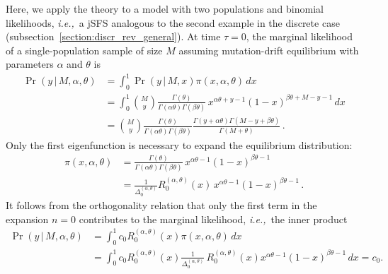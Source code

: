 \documentclass[preprint]{elsarticle}
\newcommand\given{{\,|\,}}
\newcommand\ie{{\it i.e.,}}
\begin{document}
Here, we apply the theory to a model with two populations and binomial likelihoods, \ie\ a jSFS analogous to the second example in the discrete case (subsection~\ref{section:discr_rev_general}). At time $\tau=0$, the marginal likelihood of a single-population sample of size $M$ assuming mutation-drift equilibrium with parameters $\alpha$ and $\theta$ is
\begin{equation}
\begin{split}
    \Pr(y\given M,\alpha,\theta)
    &=\int_0^1 \Pr(y\given M,x) \pi(x,\alpha,\theta)\,dx\\
    &=\int_0^1 \binom{M}{y}\frac{\Gamma(\theta)}{\Gamma(\alpha\theta)\Gamma(\beta\theta)}\,x^{\alpha\theta+y-1}(1-x)^{\beta\theta+M-y-1}\,dx\\
    &=\binom{M}{y}\frac{\Gamma(\theta)}{\Gamma(\alpha\theta)\Gamma(\beta\theta)}
    \frac{\Gamma(y+\alpha\theta)\Gamma(M-y+\beta\theta)}{\Gamma(M+\theta)}\,.
\end{split}
\end{equation}
Only the first eigenfunction is necessary to expand the equilibrium distribution:
\begin{equation}
\begin{split}
    \pi(x,\alpha,\theta)&=\frac{\Gamma(\theta)}{\Gamma(\alpha\theta)\Gamma(\beta\theta)}\,x^{\alpha\theta-1}(1-x)^{\beta\theta-1}\\
    &=\frac{1}{\Delta_0^{(\alpha,\theta)}}R_0^{(\alpha,\theta)}(x)\,x^{\alpha\theta-1}(1-x)^{\beta\theta-1}\,.
\end{split}
\end{equation}
It follows from the orthogonality relation that only the first term in the expansion $n=0$ contributes to the marginal likelihood, \ie\ the inner product
\begin{equation}
\begin{split}
    \Pr(y\given M,\alpha,\theta)&=\int_0^1 c_0 R_0^{(\alpha,\theta)}(x) \pi(x,\alpha,\theta)\,dx\\
    &=\int_0^1 c_0 R_0^{(\alpha,\theta)}(x) \frac{1}{\Delta_0^{(\alpha,\theta)}}\,R_0^{(\alpha,\theta)}(x) x^{\alpha\theta-1}(1-x)^{\beta\theta-1}\,dx
    =c_0.
\end{split}
\end{equation}
\end{document}
